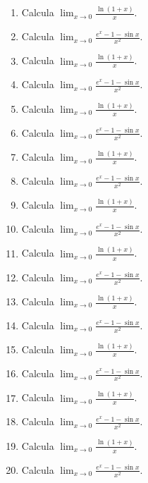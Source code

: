 \documentclass[11pt,a4paper]{article}
\begin{document}
\begin{enumerate}[label=\textbf{E\arabic*.},start=661]

\item Calcula $\displaystyle\lim_{x\to0}\frac{\ln(1+x)}{x}$.

\item Calcula $\displaystyle\lim_{x\to0}\frac{e^x-1-\sin x}{x^2}$.

\item Calcula $\displaystyle\lim_{x\to0}\frac{\ln(1+x)}{x}$.

\item Calcula $\displaystyle\lim_{x\to0}\frac{e^x-1-\sin x}{x^2}$.

\item Calcula $\displaystyle\lim_{x\to0}\frac{\ln(1+x)}{x}$.

\item Calcula $\displaystyle\lim_{x\to0}\frac{e^x-1-\sin x}{x^2}$.

\item Calcula $\displaystyle\lim_{x\to0}\frac{\ln(1+x)}{x}$.

\item Calcula $\displaystyle\lim_{x\to0}\frac{e^x-1-\sin x}{x^2}$.

\item Calcula $\displaystyle\lim_{x\to0}\frac{\ln(1+x)}{x}$.

\item Calcula $\displaystyle\lim_{x\to0}\frac{e^x-1-\sin x}{x^2}$.

\item Calcula $\displaystyle\lim_{x\to0}\frac{\ln(1+x)}{x}$.

\item Calcula $\displaystyle\lim_{x\to0}\frac{e^x-1-\sin x}{x^2}$.

\item Calcula $\displaystyle\lim_{x\to0}\frac{\ln(1+x)}{x}$.

\item Calcula $\displaystyle\lim_{x\to0}\frac{e^x-1-\sin x}{x^2}$.

\item Calcula $\displaystyle\lim_{x\to0}\frac{\ln(1+x)}{x}$.

\item Calcula $\displaystyle\lim_{x\to0}\frac{e^x-1-\sin x}{x^2}$.

\item Calcula $\displaystyle\lim_{x\to0}\frac{\ln(1+x)}{x}$.

\item Calcula $\displaystyle\lim_{x\to0}\frac{e^x-1-\sin x}{x^2}$.

\item Calcula $\displaystyle\lim_{x\to0}\frac{\ln(1+x)}{x}$.

\item Calcula $\displaystyle\lim_{x\to0}\frac{e^x-1-\sin x}{x^2}$.

\end{enumerate}
\end{document}
